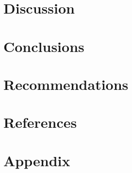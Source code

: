 \documentclass{article}
\begin{document}
    \newpage\vspace*{-5pt}
    \section{Discussion}

    \newpage\vspace*{-5pt}
    \section{Conclusions}

    \newpage\vspace*{-5pt}
    \section{Recommendations}

    \newpage\vspace*{-5pt}
    \section{References}
    
    \newpage\vspace*{-5pt}
    \section{Appendix}
  
   
    \newpage
    





        
    
\end{document}
